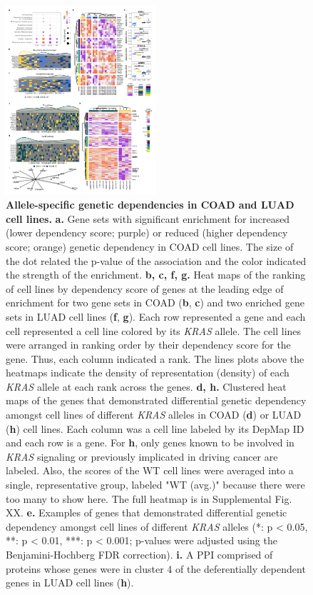 \documentclass[english, 12pt, letterpaper]{article}
\newcommand{\KRAS}{\emph{KRAS}}
\begin{document}
\begin{figure}
\centering
\includegraphics[height=70mm]{figures/Figure_04.jpeg}
\caption{
    \textbf{Allele-specific genetic dependencies in COAD and LUAD cell lines.}
    \textbf{a.} Gene sets with significant enrichment for increased (lower dependency score; purple) or reduced (higher dependency score; orange) genetic dependency in COAD cell lines. The size of the dot related the p-value of the association and the color indicated the strength of the enrichment.
    \textbf{b, c, f, g.} Heat maps of the ranking of cell lines by dependency score of genes at the leading edge of enrichment for two gene sets in COAD (\textbf{b}, \textbf{c}) and two enriched gene sets in LUAD cell lines (\textbf{f}, \textbf{g}). Each row represented a gene and each cell represented a cell line colored by its \KRAS{} allele. The cell lines were arranged in ranking order by their dependency score for the gene. Thus, each column indicated a rank. The lines plots above the heatmaps indicate the density of representation (density) of each \KRAS{} allele at each rank across the genes.
    \textbf{d, h.} Clustered heat maps of the genes that demonstrated differential genetic dependency amongst cell lines of different \KRAS{} alleles in COAD (\textbf{d}) or LUAD (\textbf{h}) cell lines. Each column was a cell line labeled by its DepMap ID and each row is a gene. For \textbf{h}, only genes known to be involved in \KRAS{} signaling or previously implicated in driving cancer are labeled. Also, the scores of the WT cell lines were averaged into a single, representative group, labeled "WT (avg.)" because there were too many to show here. The full heatmap is in Supplemental Fig. XX.
    \textbf{e.} Examples of genes that demonstrated differential genetic dependency amongst cell lines of different \KRAS{} alleles (*: p < 0.05, **: p < 0.01, ***: p < 0.001; p-values were adjusted using the Benjamini-Hochberg FDR correction).
    \textbf{i.} A PPI comprised of proteins whose genes were in cluster 4 of the deferentially dependent genes in LUAD cell lines (\textbf{h}).
}
\label{fig:coadluad-dependency-main}
\end{figure}
\end{document}
